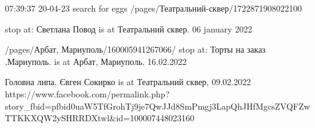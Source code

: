  
 
 
 
 

07:39:37 20-04-23
search for eggs
/pages/Театральний-сквер/1722871908022100

stop at: Светлана Повод is at Театральний сквер. 06 january 2022

/pages/Арбат, Мариуполь/160005941267066/
stop at: Торты на заказ ,Мариуполь. is at Арбат, Мариуполь. 16.02.2022

Головна липа, Євген Сокирко is at Театральний сквер, 09.02.2022
https://www.facebook.com/permalink.php?story_fbid=pfbid0uaW5TfGrohTj9je7QwJJd8SmPmgj3LapQhJHfMgcsZVQFZwTTKKXQW2ySHRRDXtwl&id=100007448023160

